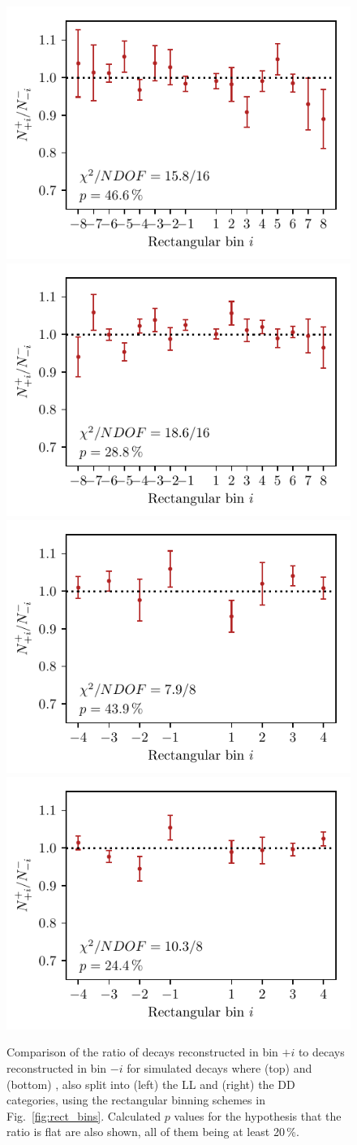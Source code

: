 \begin{figure}[tb]
    \centering
    \includegraphics[width=0.45\columnwidth]{figures/analysis/systematics/efficiency_symmetry_Pi_PiPi_LL.pdf}
    \includegraphics[width=0.45\columnwidth]{figures/analysis/systematics/efficiency_symmetry_Pi_PiPi_DD.pdf}
    \includegraphics[width=0.45\columnwidth]{figures/analysis/systematics/efficiency_symmetry_Pi_KK_LL.pdf}
    \includegraphics[width=0.45\columnwidth]{figures/analysis/systematics/efficiency_symmetry_Pi_KK_DD.pdf}
    \caption{Comparison of the ratio of \Bp decays reconstructed in bin $+i$ to \Bm decays reconstructed in bin $-i$ for simulated \BtoDpi decays where (top) \DtoKspp and (bottom) \DtoKskk, also split into (left) the LL and (right) the DD categories, using the rectangular binning schemes in Fig.~\ref{fig:rect_bins}. Calculated $p$ values for the hypothesis that the ratio is flat are also shown, all of them being at least 20\,\%.}
    \label{fig:efficiency_symmetry_check}
\end{figure}



